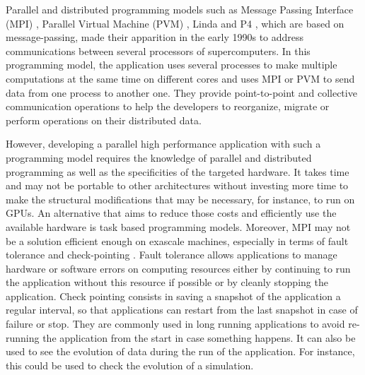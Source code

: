 Parallel and distributed programming models such as Message Passing Interface (MPI) \cite{MPIForum}, Parallel Virtual Machine (PVM) \cite{GBDJM1995}, Linda \cite{GeleC1992} \cite{CaGMS1994} and P4 \cite{ButRL1992}, which are based on message-passing, made their apparition in the early 1990s to address communications between several processors of supercomputers.
In this programming model, the application uses several processes to make multiple computations at the same time on different cores and uses MPI or PVM to send data from one process to another one.
They provide point-to-point and collective communication operations to help the developers to reorganize, migrate or perform operations on their distributed data.

However, developing a parallel high performance application with such a programming model requires the knowledge of parallel and distributed programming as well as the specificities of the targeted hardware.
It takes time and may not be portable to other architectures without investing more time to make the structural modifications that may be necessary, for instance, to run on GPUs.
An alternative that aims to reduce those costs and efficiently use the available hardware is task based programming models.
Moreover, MPI may not be a solution efficient enough on exascale machines, especially in terms of fault tolerance and check-pointing \cite{SWAAB2014}.
Fault tolerance allows applications to manage hardware or software errors on computing resources either by continuing to run the application without this resource if possible or by cleanly stopping the application.
Check pointing consists in saving a snapshot of the application a regular interval, so that applications can restart from the last snapshot in case of failure or stop.
They are commonly used in long running applications to avoid re-running the application from the start in case something happens.
It can also be used to see the evolution of data during the run of the application.
For instance, this could be used to check the evolution of a simulation.

